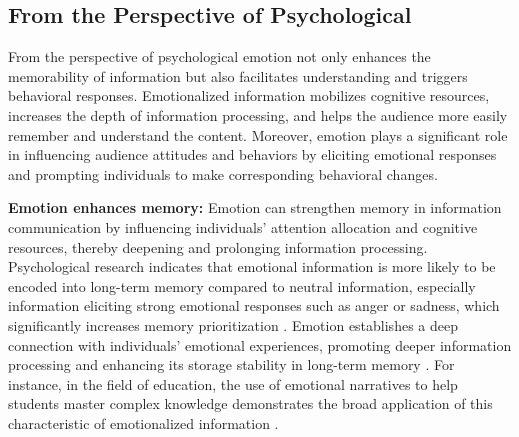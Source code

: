 \subsection{From the Perspective of Psychological}%
From the perspective of psychological emotion not only enhances the memorability of information but also facilitates understanding and triggers behavioral responses. Emotionalized information mobilizes cognitive resources, increases the depth of information processing, and helps the audience more easily remember and understand the content. Moreover, emotion plays a significant role in influencing audience attitudes and behaviors by eliciting emotional responses and prompting individuals to make corresponding behavioral changes.

\textbf{Emotion enhances memory:} Emotion can strengthen memory in information communication by influencing individuals’ attention allocation and cognitive resources, thereby deepening and prolonging information processing. Psychological research indicates that emotional information is more likely to be encoded into long-term memory compared to neutral information, especially information eliciting strong emotional responses such as anger or sadness, which significantly increases memory prioritization \cite{mather2011arousal}. Emotion establishes a deep connection with individuals’ emotional experiences, promoting deeper information processing and enhancing its storage stability in long-term memory \cite{jimenez2012emotional}. For instance, in the field of education, the use of emotional narratives to help students master complex knowledge demonstrates the broad application of this characteristic of emotionalized information \cite{tyng2017influences}.

